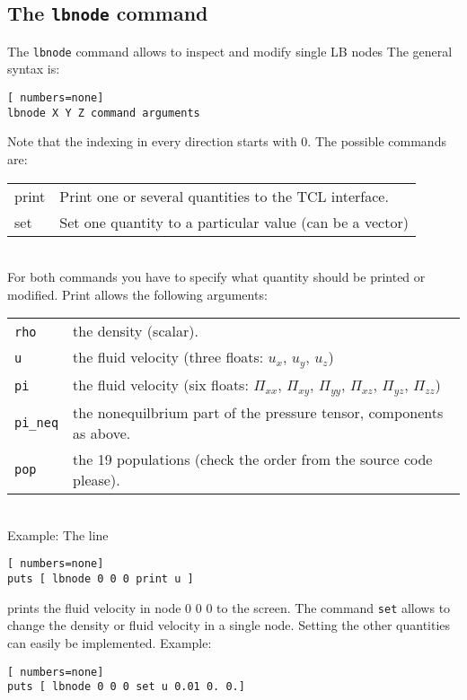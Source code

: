 \subsection*{The \texttt{lbnode} command}
The \texttt{lbnode} command allows to inspect and modify single LB nodes The
general syntax is:
\vspace{0,2cm}
\begin{lstlisting}[ numbers=none]
lbnode X Y Z command arguments
\end{lstlisting}
\vspace{0,2cm}
Note that the indexing in every direction starts with 0. The possible commands are:
\vspace{0,8cm}
\begin{tabular}{p{}p{}}
  print & Print one or several quantities to the TCL interface.\\
  set & Set one quantity to a particular value (can be a vector)\\
\end{tabular}\\
\vspace{0,8cm}
For both commands you have to specify what quantity should be printed
or modified. Print allows the following arguments: \\


\vspace{0,8cm}
\begin{tabular}{p{}p{}}
  \texttt{rho}\ & the density (scalar). \\
  \texttt{u} & the fluid velocity (three floats: $u_x$, $u_y$, $u_z$) \\
  \texttt{pi} & the fluid velocity (six floats: $\Pi_{xx}$, $\Pi_{xy}$, $\Pi_{yy}$, $\Pi_{xz}$,  $\Pi_{yz}$,  $\Pi_{zz}$) \\
  \texttt{pi\_neq} & the nonequilbrium part of the pressure tensor, components as above. \\
  \texttt{pop} & the 19 populations (check the order from the source code please).
\end{tabular} \\
\vspace{0,8cm}
Example:
The line
\vspace{0,2cm}
\begin{lstlisting}[ numbers=none]
puts [ lbnode 0 0 0 print u ]
\end{lstlisting}
\vspace{0,2cm}
prints the fluid velocity in node 0 0 0 to the screen.
The command \texttt{set} allows to change the density or fluid velocity in a single node. Setting
the other quantities can easily be implemented.
Example:
\begin{lstlisting}[ numbers=none]
puts [ lbnode 0 0 0 set u 0.01 0. 0.]
\end{lstlisting}
